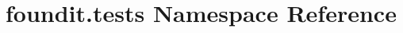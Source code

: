 \hypertarget{namespacefoundit_1_1tests}{}\section{foundit.\+tests Namespace Reference}
\label{namespacefoundit_1_1tests}
